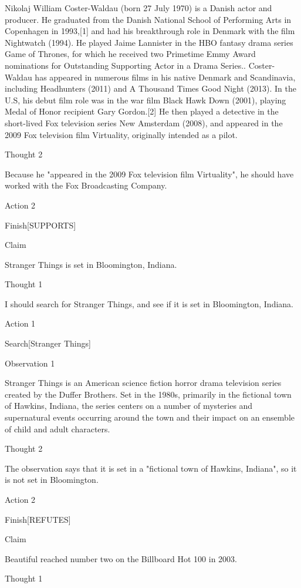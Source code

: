 \documentclass[
]{article}
\begin{document}
Nikolaj William Coster-Waldau (born 27 July 1970) is a Danish actor and
producer. He graduated from the Danish National School of Performing
Arts in Copenhagen in 1993,{[}1{]} and had his breakthrough role in
Denmark with the film Nightwatch (1994). He played Jaime Lannister in
the HBO fantasy drama series Game of Thrones, for which he received two
Primetime Emmy Award nominations for Outstanding Supporting Actor in a
Drama Series.. Coster-Waldau has appeared in numerous films in his
native Denmark and Scandinavia, including Headhunters (2011) and A
Thousand Times Good Night (2013). In the U.S, his debut film role was in
the war film Black Hawk Down (2001), playing Medal of Honor recipient
Gary Gordon.{[}2{]} He then played a detective in the short-lived Fox
television series New Amsterdam (2008), and appeared in the 2009 Fox
television film Virtuality, originally intended as a pilot.

Thought 2

Because he "appeared in the 2009 Fox television film Virtuality", he
should have worked with the Fox Broadcasting Company.

Action 2

Finish{[}SUPPORTS{]}

Claim

Stranger Things is set in Bloomington, Indiana.

Thought 1

I should search for Stranger Things, and see if it is set in
Bloomington, Indiana.

Action 1

Search{[}Stranger Things{]}

Observation 1

Stranger Things is an American science fiction horror drama television
series created by the Duffer Brothers. Set in the 1980s, primarily in
the fictional town of Hawkins, Indiana, the series centers on a number
of mysteries and supernatural events occurring around the town and their
impact on an ensemble of child and adult characters.

Thought 2

The observation says that it is set in a "fictional town of Hawkins,
Indiana", so it is not set in Bloomington.

Action 2

Finish{[}REFUTES{]}

Claim

Beautiful reached number two on the Billboard Hot 100 in 2003.

Thought 1
\end{document}
